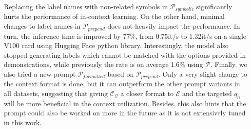 Replacing the label names with non-related symbols in $\mathcal{P}_{symbolic}$ significantly hurts the performance of in-context learning. On the other hand, minimal changes to label names in $\mathcal{P}_{prepend}$ does not heavily impact the performance. In turn, the inference time is improved by 77\%, from 0.75it/s to 1.32it/s on a single V100 card using Hugging Face python library. Interestingly, the model also stopped generating labels which cannot be matched with the options provided in demonstrations, while previously the rate is on average 1.6\% using $\mathcal{P}$. Finally, we also tried a new prompt $\mathcal{P}_{formatted}$ based on $\mathcal{P}_{prepend}$. Only a very slight change to the context format is done, but it can outperform the other prompt variants in all datasets, suggesting that giving $\mathcal{C}_{\mathcal{Q}}$ a closer format to $\mathcal{E}$ and the targeted $q_n$ will be more beneficial in the context utilization. Besides, this also hints that the prompt could also be worked on more in the future as it is not extensively tuned in this work. 